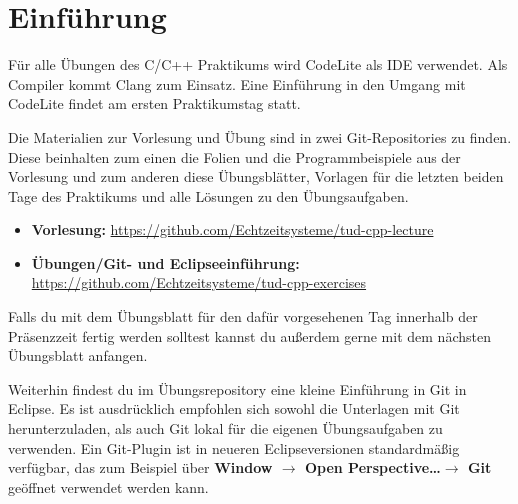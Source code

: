 \section*{Einführung}
Für alle Übungen des C/C++ Praktikums wird CodeLite als IDE verwendet. Als Compiler kommt Clang zum Einsatz.
Eine Einführung in den Umgang mit CodeLite findet am ersten Praktikumstag statt.

Die Materialien zur Vorlesung und Übung sind in zwei Git-Repositories zu finden.
Diese beinhalten zum einen die Folien und die Programmbeispiele aus der Vorlesung und zum anderen diese Übungsblätter, Vorlagen für die letzten beiden Tage des Praktikums und alle Lösungen zu den Übungsaufgaben.

\begin{itemize}
	\item \textbf{Vorlesung:} \url{https://github.com/Echtzeitsysteme/tud-cpp-lecture}
	\item \textbf{Übungen/Git- und Eclipseeinführung:} \url{https://github.com/Echtzeitsysteme/tud-cpp-exercises}
\end{itemize}

Falls du mit dem Übungsblatt für den dafür vorgesehenen Tag innerhalb der Präsenzzeit fertig werden solltest kannst du außerdem gerne mit dem nächsten Übungsblatt anfangen.

Weiterhin findest du im Übungsrepository eine kleine Einführung in Git in Eclipse.
Es ist ausdrücklich empfohlen sich sowohl die Unterlagen mit Git herunterzuladen, als auch Git lokal für die eigenen Übungsaufgaben zu verwenden.
Ein Git-Plugin ist in neueren Eclipseversionen standardmäßig verfügbar, das zum Beispiel über \textbf{Window $\rightarrow$ Open Perspective\dots $\rightarrow$ Git}  geöffnet verwendet werden kann.



